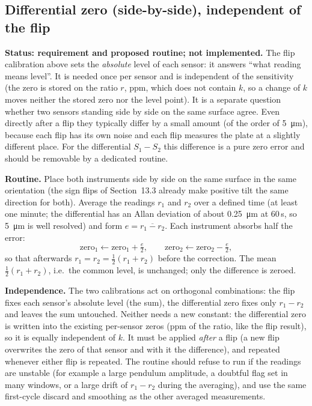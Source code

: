 \documentclass[11pt,a4paper]{article}
\begin{document}
\subsection{Differential zero (side-by-side), independent of the flip}

\textbf{Status: requirement and proposed routine; not implemented.}  The flip
calibration above sets the \emph{absolute} level of each sensor: it answers
``what reading means level''.  It is needed once per sensor and is
independent of the sensitivity (the zero is stored on the ratio $r$, ppm, which does
not contain $k$, so a change of $k$ moves neither the stored zero nor the level point).
It is a separate question whether two sensors standing side by side on the
same surface agree.  Even directly after a flip they typically differ by a
small amount (of the order of \SI{5}{\micro\metre}), because each flip has its
own noise and each flip measures the plate at a slightly different place.
For the differential $S_1-S_2$ this difference is a pure zero error and
should be removable by a dedicated routine.

\textbf{Routine.}  Place both instruments side by side on the same surface in
the same orientation (the sign flips of Section~13.3 already make positive
tilt the same direction for both).  Average the readings $r_1$ and $r_2$ over
a defined time (at least one minute; the differential has an Allan deviation
of about \SI{0.25}{\micro\metre} at 60\,s, so \SI{5}{\micro\metre} is well
resolved) and form $e=\overline{r_1-r_2}$.  Each instrument absorbs half the
error:
\begin{equation}
  \text{zero}_1 \leftarrow \text{zero}_1 + \tfrac{e}{2},\qquad
  \text{zero}_2 \leftarrow \text{zero}_2 - \tfrac{e}{2},
\end{equation}
so that afterwards $r_1=r_2=\tfrac12(r_1+r_2)$ before the correction.  The
mean $\tfrac12(r_1+r_2)$, i.e.\ the common level, is unchanged; only the
difference is zeroed.

\textbf{Independence.}  The two calibrations act on orthogonal combinations:
the flip fixes each sensor's absolute level (the sum), the differential zero
fixes only $r_1-r_2$ and leaves the sum untouched.  Neither needs a new
constant: the differential zero is written into the existing per-sensor zeros
(ppm of the ratio, like the flip result), so it is equally independent of $k$.  It must be applied \emph{after} a flip
(a new flip overwrites the zero of that sensor and with it the difference),
and repeated whenever either flip is repeated.  The routine should refuse to
run if the readings are unstable (for example a large pendulum amplitude, a
doubtful flag set in many windows, or a large drift of $r_1-r_2$ during the
averaging), and use the same first-cycle discard and smoothing as the other
averaged measurements.
\end{document}
